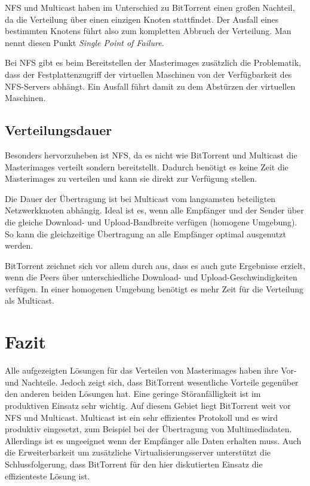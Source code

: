 NFS und Multicast haben im Unterschied zu BitTorrent einen großen Nachteil, da die Verteilung über einen einzigen Knoten stattfindet. Der Ausfall eines bestimmten Knotens führt also zum kompletten Abbruch der Verteilung. Man nennt diesen Punkt \textit{Single Point of Failure}. 

Bei NFS gibt es beim Bereitstellen der Masterimages zusätzlich die Problematik, dass der Festplattenzugriff der virtuellen Maschinen von der Verfügbarkeit des NFS-Servers abhängt. Ein Ausfall führt damit zu dem Abstürzen der virtuellen Maschinen.


\subsection{Verteilungsdauer}
Besonders hervorzuheben ist NFS, da es nicht wie BitTorrent und Multicast die Masterimages verteilt sondern bereitstellt. Dadurch benötigt es keine Zeit die Masterimages zu verteilen und kann sie direkt zur Verfügung stellen. 

Die Dauer der Übertragung ist bei Multicast vom langsamsten beteiligten Netzwerkknoten abhängig. Ideal ist es, wenn alle Empfänger und der Sender über die gleiche Download- und Upload-Bandbreite verfügen (homogene Umgebung). So kann die gleichzeitige Übertragung an alle Empfänger optimal ausgenutzt werden.

BitTorrent zeichnet sich vor allem durch aus, dass es auch gute Ergebnisse erzielt, wenn die Peers über unterschiedliche Download- und Upload-Geschwindigkeiten verfügen. In einer homogenen Umgebung benötigt es mehr Zeit für die Verteilung als Multicast. 

\section{Fazit}

Alle aufgezeigten Lösungen für das Verteilen von Masterimages haben ihre Vor- und Nachteile. Jedoch zeigt sich, dass BitTorrent wesentliche Vorteile gegenüber den anderen beiden Lösungen hat. Eine geringe Störanfälligkeit ist im produktiven Einsatz sehr wichtig. Auf diesem Gebiet liegt BitTorrent weit vor NFS und Multicast. Multicast ist ein sehr effizientes Protokoll und es wird produktiv eingesetzt, zum Beispiel bei der Übertragung von Multimediadaten. Allerdings ist es ungeeignet wenn der Empfänger alle Daten erhalten muss. Auch die Erweiterbarkeit um zusätzliche Virtualisierungsserver unterstützt die Schlussfolgerung, dass BitTorrent für den hier diskutierten Einsatz die effizienteste Lösung ist.